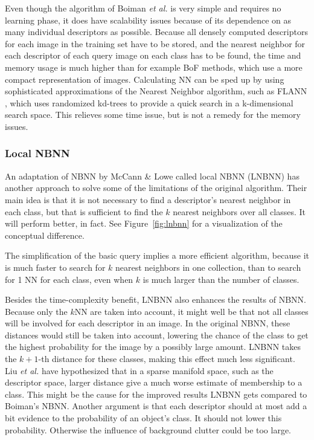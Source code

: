 Even though the algorithm of Boiman \emph{et al.} \cite{boiman2008defense} is very simple and requires no learning phase, it does have scalability issues because of its dependence on as many individual descriptors as possible. Because all densely computed descriptors for each image in the training set have to be stored, and the nearest neighbor for each descriptor of each query image on each class has to be found, the time and memory usage is much higher than for example BoF methods, which use a more compact representation of images. Calculating NN can be sped up by using sophisticated approximations of the Nearest Neighbor algorithm, such as FLANN \cite{muja2009fast}, which uses randomized kd-trees to provide a quick search in a k-dimensional search space. This relieves some time issue, but is not a remedy for the memory issues.


\subsubsection{Local NBNN} %
\label{sec:local_nbnn}

An adaptation of NBNN by McCann \& Lowe called local NBNN (LNBNN)\cite{mccann2012local} has another approach to solve some of the limitations of the original algorithm. Their main idea is that it is not necessary to find a descriptor's nearest neighbor in each class, but that is sufficient to find the $k$ nearest neighbors over all classes. It will perform better, in fact. See Figure~\ref{fig:lnbnn} for a visualization of the conceptual difference.

The simplification of the basic query implies a more efficient algorithm, because it is much faster to search for $k$ nearest neighbors in one collection, than to search for 1 NN for each class, even when $k$ is much larger than the number of classes.

Besides the time-complexity benefit, LNBNN also enhances the results of NBNN. Because only the $k$NN are taken into account, it might well be that not all classes will be involved for each descriptor in an image. In the original NBNN, these distances would still be taken into account, lowering the chance of the class to get the highest probability for the image by a possibly large amount. LNBNN takes the $k+1$-th distance for these classes, making this effect much less significant. Liu \emph{et al.}\cite{liu2011defense} have hypothesized that in a sparse manifold space, such as the descriptor space, larger distance give a much worse estimate of membership to a class. This might be the cause for the improved results LNBNN gets compared to Boiman's NBNN. Another argument is that each descriptor should at most add a bit evidence to the probability of an object's class. It should not lower this probability. Otherwise the influence of background clutter could be too large.

